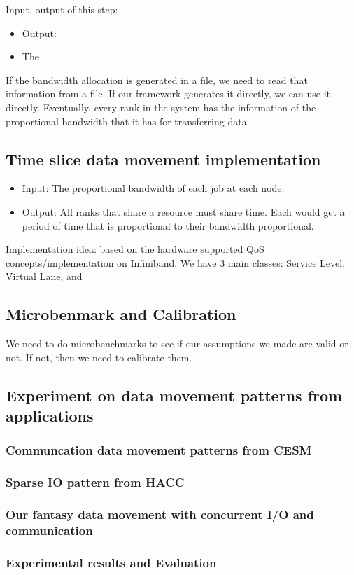 \documentclass[letter]{article}
\begin{document}
Input, output of this step:
\begin{itemize}
\item Output:
\item The
\end{itemize}

If the bandwidth allocation is generated in a file, we need to read that information from a file. If our framework generates it directly, we can use it directly. Eventually, every rank in the system has the information of the proportional bandwidth that it has for transferring data.

\subsection{Time slice data movement implementation}
\begin{itemize}
\item Input: The proportional bandwidth of each job at each node.
\item Output: All ranks that share a resource must share time. Each would get a period of time that is proportional to their bandwidth proportional.
\end{itemize}

Implementation idea: based on the hardware supported QoS concepts/implementation on Infiniband. We have 3 main classes: Service Level, Virtual Lane, and 

\subsection{Microbenmark and Calibration}

We need to do microbenchmarks to see if our assumptions we made are valid or not. If not, then we need to calibrate them.

\subsection{Experiment on data movement patterns from applications}
\subsubsection{Communcation data movement patterns from CESM}
\subsubsection{Sparse IO pattern from HACC}
\subsubsection{Our fantasy data movement with concurrent I/O and communication}

\subsubsection{Experimental results and Evaluation}
\end{document}
